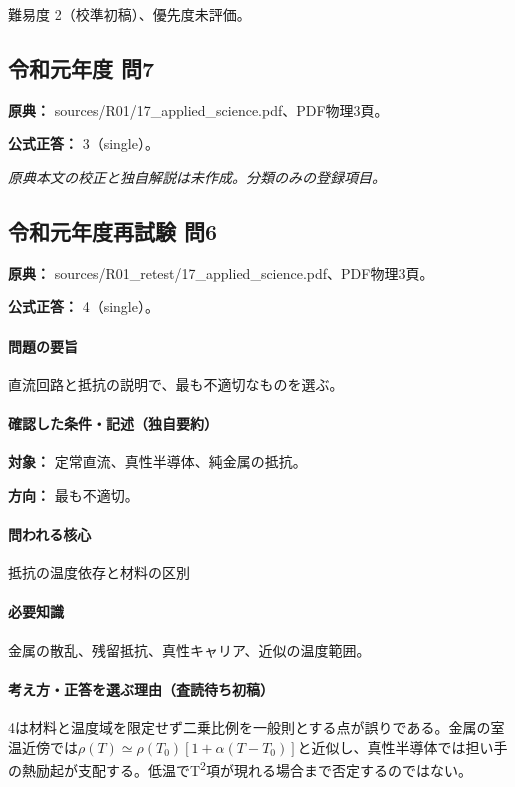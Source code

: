 \par 難易度 2（校準初稿）、優先度未評価。

\subsection{令和元年度 問7}
\label{q:r01-reg-applied-07}

\noindent\textbf{原典：} sources/R01/17\_applied\_science.pdf、PDF物理3頁。

\textbf{公式正答：} 3（single）。

\par\textit{原典本文の校正と独自解説は未作成。分類のみの登録項目。}

\subsection{令和元年度再試験 問6}
\label{q:r01-ret-applied-06}

\noindent\textbf{原典：} sources/R01\_retest/17\_applied\_science.pdf、PDF物理3頁。

\textbf{公式正答：} 4（single）。

\paragraph{問題の要旨} 直流回路と抵抗の説明で、最も不適切なものを選ぶ。

\paragraph{確認した条件・記述（独自要約）}\mbox{}\par

\noindent\textbf{対象：} 定常直流、真性半導体、純金属の抵抗。\par

\noindent\textbf{方向：} 最も不適切。\par

\paragraph{問われる核心} 抵抗の温度依存と材料の区別

\paragraph{必要知識} 金属の散乱、残留抵抗、真性キャリア、近似の温度範囲。

\paragraph{考え方・正答を選ぶ理由（査読待ち初稿）} 4は材料と温度域を限定せず二乗比例を一般則とする点が誤りである。金属の室温近傍では\(\rho(T)\simeq\rho(T_0)[1+\alpha(T-T_0)]\)と近似し、真性半導体では担い手の熱励起が支配する。低温でT\textsuperscript{2}項が現れる場合まで否定するのではない。

